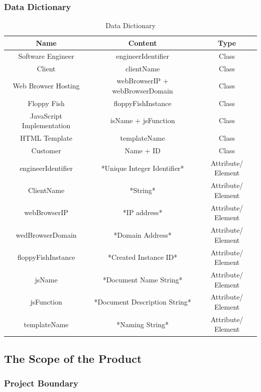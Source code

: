 \documentclass[11pt, oneside]{article}   	%
\begin{document}
\subsubsection{Data Dictionary}
\begin{table}[H]
\caption{Data Dictionary}
\begin{center}
\begin{tabular}{|c|c|c|}
\hline
Name & Content &Type\\
\hline
Software Engineer & engineerIdentifier & Class\\
\hline
Client & clientName	& Class\\
\hline
Web Browser Hosting & webBrowserIP + webBrowserDomain	& Class\\
\hline
Floppy Fish & floppyFishInstance & Class\\
\hline
JavaScript Implementation & isName + jsFunction & Class\\
\hline
HTML Template	 & templateName & Class\\
\hline
Customer	& Name + ID & Class\\
\hline
engineerIdentifier & *Unique Integer Identifier* & Attribute/ Element\\
\hline
ClientName & *String* & Attribute/ Element\\
\hline
webBrowserIP & *IP address* & Attribute/ Element\\
\hline
wedBrowserDomain & *Domain Address* & Attribute/ Element\\
\hline
floppyFishInstance & *Created Instance ID* & Attribute/ Element\\
\hline
jsName & *Document Name String*	& Attribute/ Element\\
\hline
jsFunction	& *Document Description String* & Attribute/ Element\\
\hline
templateName & *Naming String* & Attribute/ Element\\
\hline
\end{tabular}
\end{center}
\label{default}
\end{table}%



\subsection{The Scope of the Product}
\subsubsection{Project Boundary}
\end{document}
